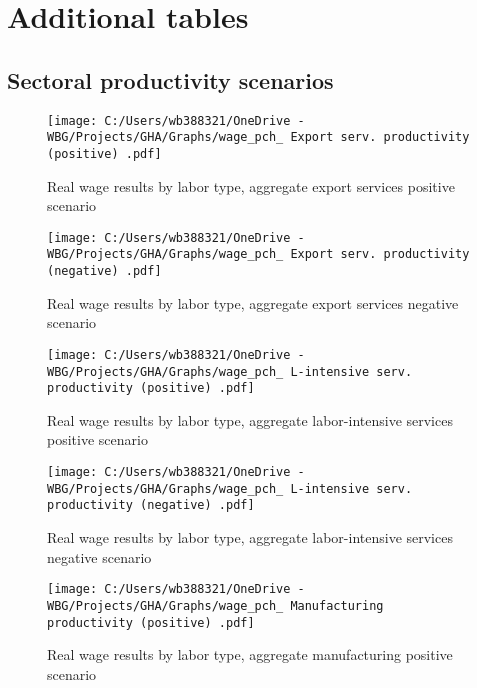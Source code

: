 \documentclass[11pt,english]{article}
\begin{document}
\newpage
\section{Additional tables}


\subsection{Sectoral productivity scenarios}
\begin{figure}[ht!]\caption{Real wage results by labor type, aggregate export services positive scenario} \label{fig_AggSRVhp_wage_pch}
	\centering
	\texttt{[image: C:/Users/wb388321/OneDrive - WBG/Projects/GHA/Graphs/wage\_pch\_ Export serv. productivity (positive) .pdf]}
\end{figure}

\begin{figure}[ht!]\caption{Real wage results by labor type, aggregate export services negative scenario} \label{fig_AggSRVhn_wage_pch}
	\centering
	\texttt{[image: C:/Users/wb388321/OneDrive - WBG/Projects/GHA/Graphs/wage\_pch\_ Export serv. productivity (negative) .pdf]}
\end{figure}

\begin{figure}[ht!]\caption{Real wage results by labor type, aggregate labor-intensive services positive scenario} \label{fig_AggSRVlp_wage_pch}
	\centering
	\texttt{[image: C:/Users/wb388321/OneDrive - WBG/Projects/GHA/Graphs/wage\_pch\_ L-intensive serv. productivity (positive) .pdf]}
\end{figure}

\begin{figure}[ht!]\caption{Real wage results by labor type, aggregate labor-intensive services negative scenario} \label{fig_AggSRVln_wage_pch}
	\centering
	\texttt{[image: C:/Users/wb388321/OneDrive - WBG/Projects/GHA/Graphs/wage\_pch\_ L-intensive serv. productivity (negative) .pdf]}
\end{figure}

\begin{figure}[ht!]\caption{Real wage results by labor type, aggregate manufacturing positive scenario} \label{fig_AggMNFp_wage_pch}
	\centering
	\texttt{[image: C:/Users/wb388321/OneDrive - WBG/Projects/GHA/Graphs/wage\_pch\_ Manufacturing productivity (positive) .pdf]}
\end{figure}
\end{document}
